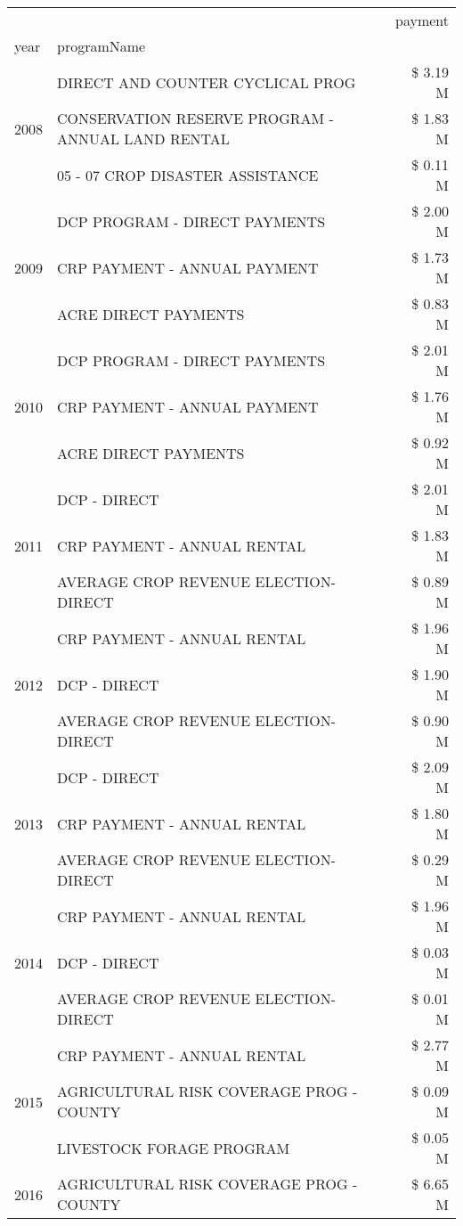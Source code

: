 \begin{tabular}{llr}
\toprule
 &  & payment \\
year & programName &  \\
\midrule
\multirow[t]{3}{*}{2008} & DIRECT AND COUNTER CYCLICAL PROG & \$ 3.19 M \\
 & CONSERVATION RESERVE PROGRAM - ANNUAL LAND RENTAL & \$ 1.83 M \\
 & 05 - 07 CROP DISASTER ASSISTANCE & \$ 0.11 M \\
\cline{1-3}
\multirow[t]{3}{*}{2009} & DCP PROGRAM - DIRECT PAYMENTS & \$ 2.00 M \\
 & CRP PAYMENT - ANNUAL PAYMENT & \$ 1.73 M \\
 & ACRE DIRECT PAYMENTS & \$ 0.83 M \\
\cline{1-3}
\multirow[t]{3}{*}{2010} & DCP PROGRAM - DIRECT PAYMENTS & \$ 2.01 M \\
 & CRP PAYMENT - ANNUAL PAYMENT & \$ 1.76 M \\
 & ACRE DIRECT PAYMENTS & \$ 0.92 M \\
\cline{1-3}
\multirow[t]{3}{*}{2011} & DCP - DIRECT & \$ 2.01 M \\
 & CRP PAYMENT - ANNUAL RENTAL & \$ 1.83 M \\
 & AVERAGE CROP REVENUE ELECTION-DIRECT & \$ 0.89 M \\
\cline{1-3}
\multirow[t]{3}{*}{2012} & CRP PAYMENT - ANNUAL RENTAL & \$ 1.96 M \\
 & DCP - DIRECT & \$ 1.90 M \\
 & AVERAGE CROP REVENUE ELECTION-DIRECT & \$ 0.90 M \\
\cline{1-3}
\multirow[t]{3}{*}{2013} & DCP - DIRECT & \$ 2.09 M \\
 & CRP PAYMENT - ANNUAL RENTAL & \$ 1.80 M \\
 & AVERAGE CROP REVENUE ELECTION-DIRECT & \$ 0.29 M \\
\cline{1-3}
\multirow[t]{3}{*}{2014} & CRP PAYMENT - ANNUAL RENTAL & \$ 1.96 M \\
 & DCP - DIRECT & \$ 0.03 M \\
 & AVERAGE CROP REVENUE ELECTION-DIRECT & \$ 0.01 M \\
\cline{1-3}
\multirow[t]{3}{*}{2015} & CRP PAYMENT - ANNUAL RENTAL & \$ 2.77 M \\
 & AGRICULTURAL RISK COVERAGE PROG - COUNTY & \$ 0.09 M \\
 & LIVESTOCK FORAGE PROGRAM & \$ 0.05 M \\
\cline{1-3}
\multirow[t]{3}{*}{2016} & AGRICULTURAL RISK COVERAGE PROG - COUNTY      & \$ 6.65 M \\

\end{tabular}
